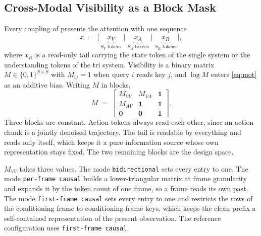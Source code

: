 \subsection{Cross-Modal Visibility as a Block Mask}
\label{sec:masks}

Every coupling of  presents the attention with one sequence
\begin{equation}
  x \;=\; \big[\, \underbrace{x_V}_{S_V \text{ tokens}} \;\big|\;
                 \underbrace{x_A}_{S_A \text{ tokens}} \;\big|\;
                 \underbrace{x_R}_{S_R \text{ tokens}} \,\big],
  \label{eq:seq}
\end{equation}
where $x_R$ is a read-only tail carrying the state token of the single system or
the understanding tokens of the tri system. Visibility is a binary matrix
$M \in \{0,1\}^{S \times S}$ with $M_{ij} = 1$ when query $i$ reads key $j$, and
$\log M$ enters \eqref{eq:mot} as an additive bias. Writing $M$ in blocks,
\begin{equation}
  M \;=\;
  \begin{bmatrix}
    M_{VV} & M_{VA} & \mathbf{1} \\
    M_{AV} & \mathbf{1} & \mathbf{1} \\
    \mathbf{0} & \mathbf{0} & \mathbf{1}
  \end{bmatrix}.
  \label{eq:maskblocks}
\end{equation}
Three blocks are constant. Action tokens always read each other, since an action
chunk is a jointly denoised trajectory. The tail is readable by everything and
reads only itself, which keeps it a pure information source whose own
representation stays fixed. The two remaining blocks are the design space.

$M_{VV}$ takes three values. The mode \texttt{bidirectional} sets every entry
to one. The mode \texttt{per-frame causal} builds a lower-triangular
matrix at frame granularity and expands it by the token count of one frame, so a
frame reads its own past. The mode \texttt{first-frame causal} sets
every entry to one and restricts the rows of the conditioning frame to
conditioning-frame keys, which keeps the clean prefix a self-contained
representation of the present observation. The reference configuration uses
\texttt{first-frame causal}.

